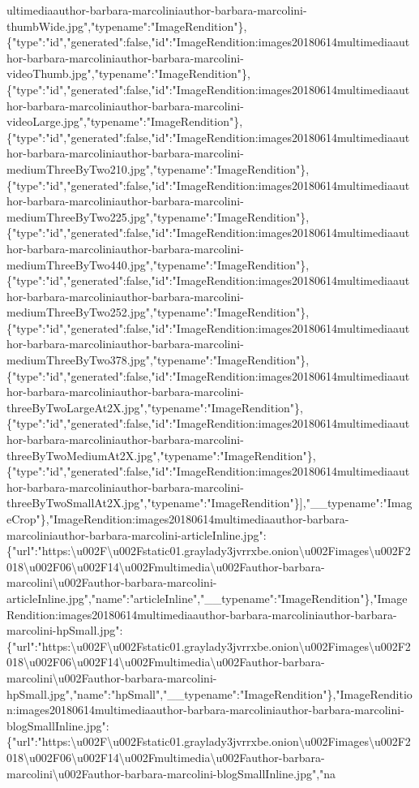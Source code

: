 ultimediaauthor-barbara-marcoliniauthor-barbara-marcolini-thumbWide.jpg","typename":"ImageRendition"\},\{"type":"id","generated":false,"id":"ImageRendition:images20180614multimediaauthor-barbara-marcoliniauthor-barbara-marcolini-videoThumb.jpg","typename":"ImageRendition"\},\{"type":"id","generated":false,"id":"ImageRendition:images20180614multimediaauthor-barbara-marcoliniauthor-barbara-marcolini-videoLarge.jpg","typename":"ImageRendition"\},\{"type":"id","generated":false,"id":"ImageRendition:images20180614multimediaauthor-barbara-marcoliniauthor-barbara-marcolini-mediumThreeByTwo210.jpg","typename":"ImageRendition"\},\{"type":"id","generated":false,"id":"ImageRendition:images20180614multimediaauthor-barbara-marcoliniauthor-barbara-marcolini-mediumThreeByTwo225.jpg","typename":"ImageRendition"\},\{"type":"id","generated":false,"id":"ImageRendition:images20180614multimediaauthor-barbara-marcoliniauthor-barbara-marcolini-mediumThreeByTwo440.jpg","typename":"ImageRendition"\},\{"type":"id","generated":false,"id":"ImageRendition:images20180614multimediaauthor-barbara-marcoliniauthor-barbara-marcolini-mediumThreeByTwo252.jpg","typename":"ImageRendition"\},\{"type":"id","generated":false,"id":"ImageRendition:images20180614multimediaauthor-barbara-marcoliniauthor-barbara-marcolini-mediumThreeByTwo378.jpg","typename":"ImageRendition"\},\{"type":"id","generated":false,"id":"ImageRendition:images20180614multimediaauthor-barbara-marcoliniauthor-barbara-marcolini-threeByTwoLargeAt2X.jpg","typename":"ImageRendition"\},\{"type":"id","generated":false,"id":"ImageRendition:images20180614multimediaauthor-barbara-marcoliniauthor-barbara-marcolini-threeByTwoMediumAt2X.jpg","typename":"ImageRendition"\},\{"type":"id","generated":false,"id":"ImageRendition:images20180614multimediaauthor-barbara-marcoliniauthor-barbara-marcolini-threeByTwoSmallAt2X.jpg","typename":"ImageRendition"\}{]},"\_\_typename":"ImageCrop"\},"ImageRendition:images20180614multimediaauthor-barbara-marcoliniauthor-barbara-marcolini-articleInline.jpg":\{"url":"https:\textbackslash{}u002F\textbackslash{}u002Fstatic01.graylady3jvrrxbe.onion\textbackslash{}u002Fimages\textbackslash{}u002F2018\textbackslash{}u002F06\textbackslash{}u002F14\textbackslash{}u002Fmultimedia\textbackslash{}u002Fauthor-barbara-marcolini\textbackslash{}u002Fauthor-barbara-marcolini-articleInline.jpg","name":"articleInline","\_\_typename":"ImageRendition"\},"ImageRendition:images20180614multimediaauthor-barbara-marcoliniauthor-barbara-marcolini-hpSmall.jpg":\{"url":"https:\textbackslash{}u002F\textbackslash{}u002Fstatic01.graylady3jvrrxbe.onion\textbackslash{}u002Fimages\textbackslash{}u002F2018\textbackslash{}u002F06\textbackslash{}u002F14\textbackslash{}u002Fmultimedia\textbackslash{}u002Fauthor-barbara-marcolini\textbackslash{}u002Fauthor-barbara-marcolini-hpSmall.jpg","name":"hpSmall","\_\_typename":"ImageRendition"\},"ImageRendition:images20180614multimediaauthor-barbara-marcoliniauthor-barbara-marcolini-blogSmallInline.jpg":\{"url":"https:\textbackslash{}u002F\textbackslash{}u002Fstatic01.graylady3jvrrxbe.onion\textbackslash{}u002Fimages\textbackslash{}u002F2018\textbackslash{}u002F06\textbackslash{}u002F14\textbackslash{}u002Fmultimedia\textbackslash{}u002Fauthor-barbara-marcolini\textbackslash{}u002Fauthor-barbara-marcolini-blogSmallInline.jpg","na